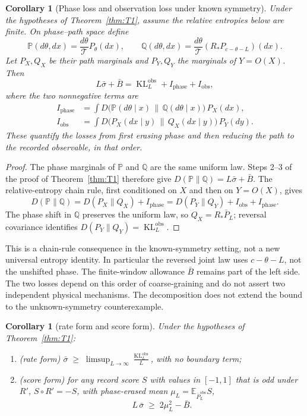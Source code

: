 \documentclass[10pt]{article}
\newtheorem{corollary}[theorem]{Corollary}
\theoremstyle{definition}
\DeclareMathOperator{\KL}{KL}
\newcommand{\per}{\mathcal T}
\newcommand{\sbar}{\bar\sigma}
\newcommand{\Bbar}{\bar B}
\newcommand{\Pbar}{\bar P}
\newcommand{\Rrec}{R'}
\newcommand{\E}{\mathbb E}
\begin{document}
\begin{corollary}[Phase loss and observation loss under known symmetry]
\label{cor:information-loss}
Under the hypotheses of Theorem~\ref{thm:T1}, assume the relative entropies
below are finite.  On phase--path space define
\[
 \mathbb P(d\theta,dx)=\frac{d\theta}{\per}P_\theta(dx),\qquad
 \mathbb Q(d\theta,dx)=\frac{d\theta}{\per}
                 (R_*P_{c-\theta-L})(dx).
\]
Let $P_X,Q_X$ be their path marginals and $P_Y,Q_Y$ the marginals of
$Y=O(X)$.  Then
\begin{equation}\label{eq:information-loss}
 L\sbar+\Bbar
 =\KL^{\mathrm{obs}}_L+I_{\mathrm{phase}}+I_{\mathrm{obs}},
\end{equation}
where the two nonnegative terms are
\begin{align*}
 I_{\mathrm{phase}}
 &=\int D\bigl(\mathbb P(d\theta\mid x)\,
                  \big\|\,\mathbb Q(d\theta\mid x)\bigr)\,P_X(dx),\\
 I_{\mathrm{obs}}
 &=\int D\bigl(P_X(dx\mid y)\,\big\|\,Q_X(dx\mid y)\bigr)\,P_Y(dy).
\end{align*}
These quantify the losses from first erasing phase and then reducing the
path to the recorded observable, in that order.
\end{corollary}
\begin{proof}
The phase marginals of $\mathbb P$ and $\mathbb Q$ are the same uniform
law.  Steps 2--3 of the proof of Theorem~\ref{thm:T1} therefore give
$D(\mathbb P\|\mathbb Q)=L\sbar+\Bbar$.  The relative-entropy chain rule,
first conditioned on $X$ and then on $Y=O(X)$, gives
\[
 D(\mathbb P\|\mathbb Q)=D(P_X\|Q_X)+I_{\mathrm{phase}}
 =D(P_Y\|Q_Y)+I_{\mathrm{obs}}+I_{\mathrm{phase}}.
\]
The phase shift in $\mathbb Q$ preserves the uniform law, so
$Q_X=R_*\Pbar_L$; reversal covariance identifies
$D(P_Y\|Q_Y)=\KL^{\mathrm{obs}}_L$.
\end{proof}
This is a chain-rule consequence in the known-symmetry setting, not a new
universal entropy identity.  In particular the reversed joint law uses
$c-\theta-L$, not the unshifted phase.  The finite-window allowance
$\Bbar$ remains part of the left side.  The two losses depend on this
order of coarse-graining and do not assert two independent physical
mechanisms.  The decomposition does not extend the bound to the
unknown-symmetry counterexample.

\begin{corollary}[rate form and score form]
\label{cor:forms}
Under the hypotheses of Theorem~\ref{thm:T1}:
\begin{enumerate}[label=(\alph*),nosep]
\item (rate form) $\displaystyle \sbar\;\geq\;\limsup_{L\to\infty}\frac{\KL^{\mathrm{obs}}_L}{L}$,
  with no boundary term;
\item (score form) for any record score $S$ with values in $[-1,1]$ that is
  odd under $\Rrec$, $S\circ\Rrec=-S$, with phase-erased mean
  $\mu_L=\E_{\Pbar^{\mathrm{obs}}_L}S$,
  \begin{equation}
  \label{eq:score}
  L\,\sbar\;\geq\;2\mu_L^2-\Bbar .
  \end{equation}
\end{enumerate}
\end{corollary}
\end{document}

